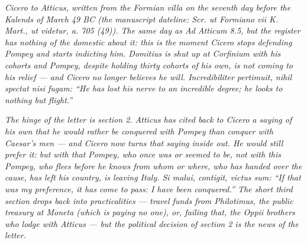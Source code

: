 
\textit{Cicero to Atticus, written from the Formian
villa on the seventh day before the Kalends of March
49 BC (the manuscript dateline: \textit{Scr. ut
Formiano vii K. Mart., ut videtur, a. 705 (49)}).
The same day as \emph{Ad Atticum} 8.5, but the
register has nothing of the domestic about it: this is
the moment Cicero stops defending Pompey and starts
indicting him. Domitius is shut up at Corfinium with
his cohorts and Pompey, despite holding thirty cohorts
of his own, is not coming to his relief --- and Cicero
no longer believes he will. \textit{Incredibiliter
pertimuit, nihil spectat nisi fugam}: ``He has lost
his nerve to an incredible degree; he looks to nothing
but flight.''}

\textit{The hinge of the letter is section 2.
Atticus has cited back to Cicero a saying of his own
that he would rather be conquered with Pompey than
conquer with Caesar's men --- and Cicero now turns
that saying inside out. He would still prefer it: but
with \emph{that} Pompey, who once was or seemed to be,
not with \emph{this} Pompey, who flees before he knows
from whom or where, who has handed over the cause, has
left his country, is leaving Italy. \textit{Si malui,
contigit, victus sum}: ``If that was my preference,
it has come to pass: I have been conquered.'' The
short third section drops back into practicalities ---
travel funds from Philotimus, the public treasury at
Moneta (which is paying no one), or, failing that, the
Oppii brothers who lodge with Atticus --- but the
political decision of section 2 is the news of the
letter.}
